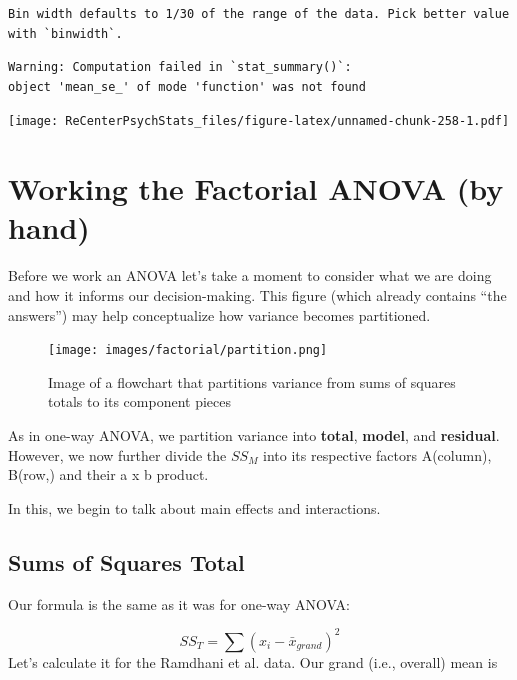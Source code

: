 \documentclass[
  11pt,
]{book}
\newenvironment{Shaded}{\begin{snugshade}}{\end{snugshade}}
\newcommand{\FunctionTok}[1]{\textcolor[rgb]{0.00,0.00,0.00}{#1}}
\newcommand{\NormalTok}[1]{#1}
\newcommand{\SpecialCharTok}[1]{\textcolor[rgb]{0.00,0.00,0.00}{#1}}
\begin{document}
\begin{verbatim}
Bin width defaults to 1/30 of the range of the data. Pick better value with `binwidth`.
\end{verbatim}

\begin{verbatim}
Warning: Computation failed in `stat_summary()`:
object 'mean_se_' of mode 'function' was not found
\end{verbatim}

\texttt{[image: ReCenterPsychStats\_files/figure-latex/unnamed-chunk-258-1.pdf]}

\hypertarget{working-the-factorial-anova-by-hand}{%
\section{Working the Factorial ANOVA (by hand)}\label{working-the-factorial-anova-by-hand}}

Before we work an ANOVA let's take a moment to consider what we are doing and how it informs our decision-making. This figure (which already contains ``the answers'') may help conceptualize how variance becomes partitioned.

\begin{figure}
\centering
\texttt{[image: images/factorial/partition.png]}
\caption{Image of a flowchart that partitions variance from sums of squares totals to its component pieces}
\end{figure}

As in one-way ANOVA, we partition variance into \textbf{total}, \textbf{model}, and \textbf{residual}. However, we now further divide the \(SS_M\) into its respective factors A(column), B(row,) and their a x b product.

In this, we begin to talk about main effects and interactions.

\hypertarget{sums-of-squares-total-1}{%
\subsection{Sums of Squares Total}\label{sums-of-squares-total-1}}

Our formula is the same as it was for one-way ANOVA:

\[SS_{T}= \sum (x_{i}-\bar{x}_{grand})^{2}\]
Let's calculate it for the Ramdhani et al. \citeyearpar{ramdhani_affective_2018} data.
Our grand (i.e., overall) mean is

\begin{Shaded}
\end{Shaded}
\end{document}
